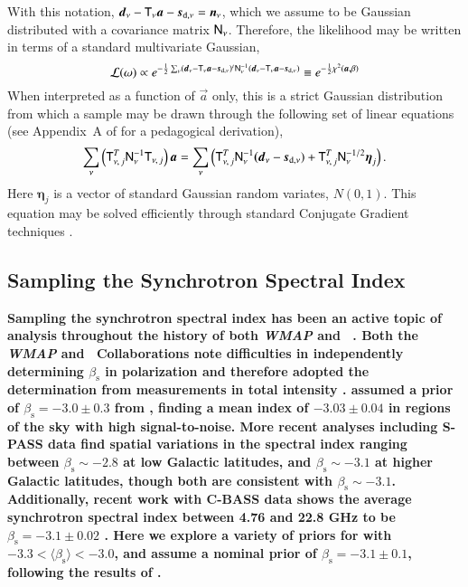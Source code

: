 \documentclass[twocolumn]{aa}
\renewcommand{\d}[0]{\vec{d}}
\newcommand{\n}[0]{\vec{n}}
\newcommand{\s}[0]{\vec{s}}
\renewcommand{\a}[0]{\vec{a}}
\newcommand{\T}[0]{\tens{T}}
\newcommand{\N}[0]{\tens{N}}
\begin{document}
With this notation, $\d_{\nu} - \T_{\nu}\a -
\s_{\mathrm{d},\nu} = \n_{\nu}$, which we assume to be Gaussian
distributed with a covariance matrix $\N_{\nu}$. Therefore, the
likelihood may be written in terms of a standard multivariate Gaussian,
\begin{equation}
  \mathcal{L}(\omega) \propto e^{-\frac{1}{2}\sum_{\nu}(\d_{\nu} - \T_{\nu}\a -
    \s_{\mathrm{d},\nu})^t\N_{\nu}^{-1}(\d_{\nu} - \T_{\nu}\a -
    \s_{\mathrm{d},\nu})} \equiv e^{-\frac{1}{2}\chi^2(\a,\beta)}
  \label{eq:likelihood}
\end{equation}
When interpreted as a function of $\a$ only, this is a strict Gaussian
distribution from which a sample may be drawn through the following
set of linear equations (see Appendix~A of \citealp{bp01} for a pedagogical
derivation),
\begin{equation}
\sum_{\nu}\left(\tens T_{\nu,\,j}^{T}\tens  N^{-1}_{\nu}\tens  T_{\nu,\,j}\right)\boldsymbol a=\sum_{\nu}\left(\tens T_{\nu,\,j}^{T} \tens N_\nu^{-1}\boldsymbol (\d_{\nu}-\s_{\mathrm{d},\nu}) + \tens T_{\nu,\,j}^T \tens N_\nu^{-1/2} \boldsymbol\eta_{j} \right).\nonumber
\label{eq:joint_lin_sample}
\end{equation}
Here $\boldsymbol\eta_{j}$ is a vector of standard Gaussian random
variates, $N(0,1)$. This equation may be solved efficiently through standard
Conjugate Gradient techniques \citep{shewchuk:1994}.

\subsection{Sampling the Synchrotron Spectral Index}\label{sub:metrop}

\textbf{Sampling the synchrotron spectral index has been an active topic of analysis throughout the history of both \textit{WMAP} and \Planck\ . Both the \textit{WMAP} and \Planck\ Collaborations note difficulties in independently determining $\beta_{\mathrm{s}}$ in polarization and therefore adopted the determination  from measurements in total intensity \citep{wmap_nine_year_final,planck2016-l04}. \cite{dunkley_2009} assumed a prior of $\beta_{\mathrm{s}}=-3.0\pm0.3$ from \cite{rybicki_lightman}, finding a mean index of $-3.03\pm0.04$ in regions of the sky with high signal-to-noise. More recent analyses including S-PASS data find spatial variations in the spectral index ranging between $\beta_{\mathrm{s}}\sim -2.8$ at low Galactic latitudes, and $\beta_{\mathrm{s}}\sim -3.1$ at higher Galactic latitudes, though both are consistent with $\beta_{\mathrm{s}}\sim -3.1$. Additionally, recent work with C-BASS data shows the average synchrotron spectral index between 4.76 and 22.8 GHz to be $\beta_{\mathrm{s}} = -3.1 \pm 0.02$ \citep{CBASS_gal_em}. Here we explore a variety of priors for with $-3.3 < \langle \beta_{\mathrm{s}} \rangle < -3.0$, and assume a nominal prior of $\beta_{\mathrm{s}} = -3.1\pm0.1$, following the results of \cite{bp14}.}
\end{document}
